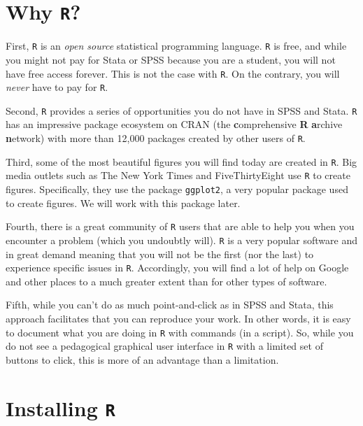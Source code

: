 \documentclass[12pt,oneside]{reedthesis}
\theoremstyle{definition}
\theoremstyle{definition}
\theoremstyle{definition}
\theoremstyle{remark}
\begin{document}
  \section{\texorpdfstring{Why \texttt{R}?}{Why R?}}\label{why-r}
  
  First, \texttt{R} is an \emph{open source} statistical programming
  language. \texttt{R} is free, and while you might not pay for Stata or
  SPSS because you are a student, you will not have free access forever.
  This is not the case with \texttt{R}. On the contrary, you will
  \emph{never} have to pay for \texttt{R}.
  
  Second, \texttt{R} provides a series of opportunities you do not have in
  SPSS and Stata. \texttt{R} has an impressive package ecosystem on CRAN
  (the \textbf{c}omprehensive \textbf{R} \textbf{a}rchive
  \textbf{n}etwork) with more than 12,000 packages created by other users
  of \texttt{R}.
  
  Third, some of the most beautiful figures you will find today are
  created in \texttt{R}. Big media outlets such as The New York Times and
  FiveThirtyEight use \texttt{R} to create figures. Specifically, they use
  the package \texttt{ggplot2}, a very popular package used to create
  figures. We will work with this package later.
  
  Fourth, there is a great community of \texttt{R} users that are able to
  help you when you encounter a problem (which you undoubtly will).
  \texttt{R} is a very popular software and in great demand meaning that
  you will not be the first (nor the last) to experience specific issues
  in \texttt{R}. Accordingly, you will find a lot of help on Google and
  other places to a much greater extent than for other types of software.
  
  Fifth, while you can't do as much point-and-click as in SPSS and Stata,
  this approach facilitates that you can reproduce your work. In other
  words, it is easy to document what you are doing in \texttt{R} with
  commands (in a script). So, while you do not see a pedagogical graphical
  user interface in \texttt{R} with a limited set of buttons to click,
  this is more of an advantage than a limitation.
  
  \section{\texorpdfstring{Installing
  \texttt{R}}{Installing R}}\label{installing-r}
  
\end{document}
